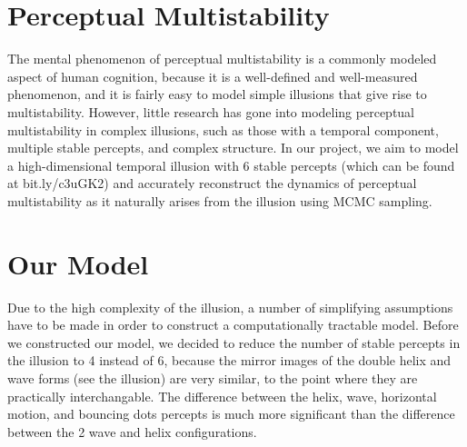 \documentclass{article} %
\begin{document}




\section{Perceptual Multistability}
The mental phenomenon of perceptual multistability is a commonly modeled aspect of human cognition, because it is a well-defined and well-measured phenomenon, and it is fairly easy to model simple illusions that give rise to multistability.
However, little research has gone into modeling perceptual multistability in complex illusions, such as those with a temporal component, multiple stable percepts, and complex structure. 
In our project, we aim to model a high-dimensional temporal illusion with 6 stable percepts (which can be found at bit.ly/c3uGK2) and accurately reconstruct the dynamics of perceptual multistability as it naturally arises from the illusion using MCMC sampling. 


\section{Our Model}
Due to the high complexity of the illusion, a number of simplifying assumptions have to be made in order to construct a computationally tractable model. Before we constructed our model, we decided to reduce the number of stable percepts in the illusion to 4 instead of 6, because the mirror images of the double helix and wave forms (see the illusion) are very similar, to the point where they are practically interchangable. The difference between the helix, wave, horizontal motion, and bouncing dots percepts is much more significant than the difference between the 2 wave and helix configurations. 
\end{document}
